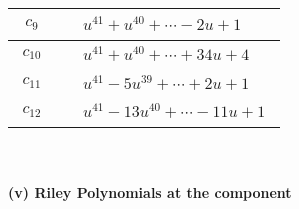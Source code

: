 \documentclass[1p]{elsarticle_modified}
\theoremstyle{definition}
\begin{document}
\begin{tabular}{m{50pt}|m{274pt}}
\hline $$\begin{aligned}c_{9}\end{aligned}$$&$\begin{aligned}
&u^{41}+u^{40}+\cdots-2 u+1
\end{aligned}$\\
\hline $$\begin{aligned}c_{10}\end{aligned}$$&$\begin{aligned}
&u^{41}+u^{40}+\cdots+34 u+4
\end{aligned}$\\
\hline $$\begin{aligned}c_{11}\end{aligned}$$&$\begin{aligned}
&u^{41}-5 u^{39}+\cdots+2 u+1
\end{aligned}$\\
\hline $$\begin{aligned}c_{12}\end{aligned}$$&$\begin{aligned}
&u^{41}-13 u^{40}+\cdots-11 u+1
\end{aligned}$\\
\hline
\end{tabular}\\~\\
\newpage\renewcommand{\arraystretch}{1}
\flushleft \textbf{(v) Riley Polynomials at the component}\newline \\
\end{document}
